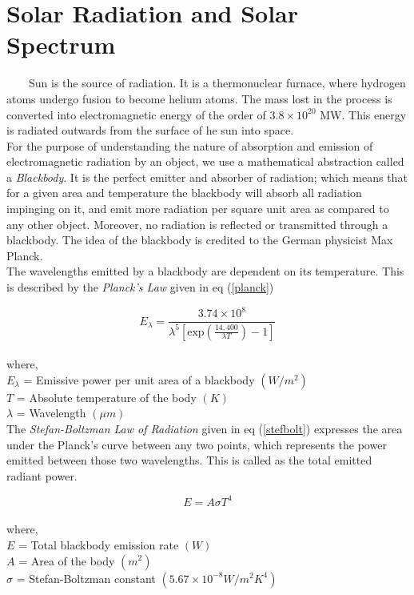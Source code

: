 
\section{Solar Radiation and Solar Spectrum}
\
\
\
\
Sun is the source of radiation. It is a thermonuclear furnace, where hydrogen atoms undergo fusion to become helium atoms. The mass lost in the process is converted into electromagnetic energy of the order of $3.8\times10^{20}$ MW. This energy is radiated outwards from the surface of he sun into space.\\

For the purpose of understanding the nature of absorption and emission of electromagnetic radiation by an object, we use a mathematical abstraction called a \textit{Blackbody}. It is the perfect emitter and absorber of radiation; which means that for a given area and temperature the blackbody will absorb  all radiation impinging on it, and emit more radiation per square unit area as compared to any other object. Moreover, no radiation is reflected or transmitted through a blackbody. The idea of the blackbody is credited to the German physicist Max Planck.\\

The wavelengths emitted by a blackbody are dependent on its temperature. This is described by the \textit{Planck's Law} given in eq (\ref{planck})

\begin{equation}
\label{planck}
E_{\lambda}=\frac{3.74\times10^{8}}{\lambda^{5} \left[\text{exp}\left( \frac{14,400}{\lambda T}\right)-1 \right]}
\end{equation}\\
where,\\
$ E_{\lambda} $ = Emissive power per unit area of a blackbody $ (W/m^{2}) $ \\
$ T $ = Absolute temperature of the body $ (K) $ \\
$ \lambda $ = Wavelength $ (\mu m) $ \\

The \textit{Stefan-Boltzman Law of Radiation} given in eq (\ref{stefbolt}) expresses the area under the Planck's curve between any two points, which represents the power emitted between those two wavelengths. This is called as the total emitted radiant power.

\begin{equation}
\label{stefbolt}
E = A \sigma T^{4}
\end{equation}\\
where,\\
$ E $ = Total blackbody emission rate $ (W) $ \\
$ A $ = Area of the body $ (m^{2}) $ \\
$ \sigma $ = Stefan-Boltzman constant $ (5.67\times10^{-8} W/m^{2}K^{4}) $ \\

